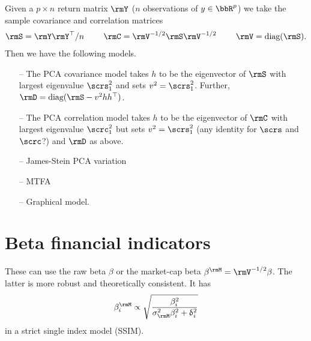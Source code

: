 \documentclass[leqno,12pt]{article}
\begin{document}
{Given a $p \times n$ return matrix $\rmY$ ($n$ observations
of $y \in \bbR^p$) we take the sample covariance
and correlation matrices
\begin{align}
 \rmS = \rmY \rmY^\top /n 
  \hspace{0.32in}
 \rmC = \rmV^{-1/2} \rmS \rmV^{-1/2}
  \hspace{0.32in}
  \rmV = \diag(\rmS).
\end{align}
Then we have the following models.
\begin{itemize}
  \item[--] The PCA covariance model takes $h$ to be the 
eigenvector of $\rmS$ with largest eigenvalue $\scrs^2_1$ and 
sets $v^2 = \scrs^2_1$. Further,
$\rmD = \diag(\rmS - v^2 h h^\top)$.
\item[--] The PCA correlation model takes $h$ to be the 
eigenvector of $\rmC$ with largest eigenvalue $\scrc^2_1$ but
sets $v^2 = \scrs^2_1$ (any identity for $\scrs$ and $\scrc$?)
and $\rmD$ as above.
\item[--] James-Stein PCA variation
\item[--] MTFA
\item[--] Graphical model.
\end{itemize}


\section{Beta financial indicators} These can use
the raw beta $\beta$ or the market-cap beta 
$\mb = \rmV^{-1/2} \beta$. The latter is more robust and 
theoretically consistent. It has
\begin{align}
  \mb_i \propto \sqrt{\frac{\beta^2_i}{\mv^2 \beta_i^2 + 
  \updelta_i^2}}
\end{align}
in a strict single index model (SSIM).

}
\end{document}

